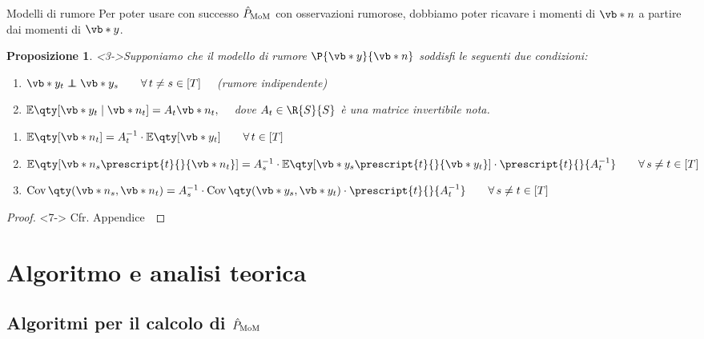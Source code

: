 \documentclass[10pt,xcolor={table,dvipsnames}]{beamer} 		%
\theoremstyle{plain}					%
\newtheorem{proposizione}{Proposizione}%
\theoremstyle{definition}
\theoremstyle{remark}
\newcommand{\transpose}[1]{\prescript{t}{}{#1}}
\newcommand{\Cov}[1]{\operatorname{Cov}\qty(#1)}
\newcommand\independent{\protect\mathpalette{\protect\independenT}{\perp}}
\def\independenT#1#2{\mathrel{\rlap{$#1#2$}\mkern2mu{#1#2}}}
\begin{document}
	\begin{frame}
		{\hypertarget{frame:prop_noise_model}{Modelli di rumore}}
		Per poter usare con successo $\hat{P}_{\textup{MoM}}$ con osservazioni rumorose,
		dobbiamo poter ricavare i momenti di $\vb*{n}$ a partire dai momenti di $\vb*{y}$.

		
		\begin{proposizione}<3->\label{prop:noise_model}
			Supponiamo che il modello di rumore $\P{\vb*{y}}{\vb*{n}}$ soddisfi le seguenti
			due condizioni:
			\begin{enumerate}
				\item<3-> $\vb*{y}_t\independent\vb*{y}_s\qquad\forall\,t\ne s\in[T]\quad$ {\smaller (rumore indipendente)}
				\item<4-> $\mathbb{E}\qty[\vb*{y}_t\mid\vb*{n}_t]=A_t\vb*{n}_t,\quad$ dove $A_t\in\R{S}{S}$ è una 
				matrice \emph{invertibile} nota.
			\end{enumerate}
			\begin{enumerate}
				\item<6-> $\mathbb{E}\qty[\vb*{n}_t]=A_t^{-1}\cdot\mathbb{E}\qty[\vb*{y}_t]\qquad\forall\,t\in[T]$
				\item<6-> $\mathbb{E}\qty[\vb*{n}_s\transpose{\vb*{n}_t}]=A_s^{-1}\cdot\mathbb{E}\qty[\vb*{y}_s\transpose{\vb*{y}_t}]\cdot\transpose{A_t^{-1}}\qquad\forall\,s\ne t\in[T]$
				\item<6-> $\Cov{\vb*{n}_s,\vb*{n}_t}=A_s^{-1}\cdot\Cov{\vb*{y}_s,\vb*{y}_t}\cdot\transpose{A_t^{-1}}\qquad\forall\,s\ne t\in[T]$
			\end{enumerate}
		\end{proposizione}
		\begin{proof}<7->
			Cfr. Appendice~\hyperlink{frame:dim_prop_noise_model:appendice}{\faHandPointRight}
		\end{proof}
	\end{frame}



\section{Algoritmo e analisi teorica}
    \subsection{Algoritmi per il calcolo di \texorpdfstring{$\hat{P}_{\textup{MoM}}$}{P}}
\end{document}
